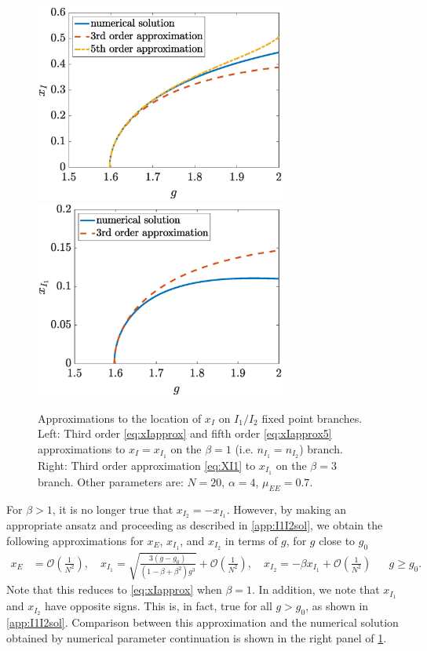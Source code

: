 \documentclass[reqno]{siamonline190516}
\begin{document}
\begin{figure}
    \centering
    \includegraphics[width=8.25cm]{Xiapprox.eps}\hspace{-0.5cm}
    \includegraphics[width=8.25cm]{Xiapproxbeta3.eps} 
    \caption{Approximations to the location of $x_I$ on $I_1/I_2$ fixed point branches. Left: Third order \cref{eq:xIapprox} and fifth order  \cref{eq:xIapprox5} approximations to $x_I=x_{I_1}$ on the $\beta = 1$ (i.e. $n_{I_1}=n_{I_2}$) branch. Right: Third order approximation \cref{eq:XI1} to $x_{I_1}$ on the $\beta=3$ branch. Other parameters are: $N = 20$,  $\alpha = 4$, $\mu_{EE} = 0.7$.}
    \label{fig:xIapprox}
\end{figure}

For $\beta > 1$, it is no longer true that $x_{I_2} = -x_{I_1}$. However, by making an appropriate ansatz and proceeding as described in \cref{app:I1I2sol}, we obtain the following approximations for $x_E$, $x_{I_1}$, and $x_{I_2}$ in terms of $g$, for $g$ close to $g_0$
\begin{align}\label{eq:XI1}
 x_E &= \mathcal{O}\left( \frac{1}{N^2}\right), \quad
 x_{I_1} = \sqrt{ \frac{ 3(g - g_0) }{ (1 - \beta + \beta^2 )g^3}} + \mathcal{O}\left( \frac{1}{N^2}\right), \quad
 x_{I_2} = -\beta x_{I_1} +  \mathcal{O}\left( \frac{1}{N^2}\right) && g \geq g_0.
\end{align}
Note that this reduces to \cref{eq:xIapprox} when $\beta = 1$. In addition, we note that $x_{I_1}$ and $x_{I_2}$ have opposite signs. This is, in fact, true for all $g > g_0$, as shown in \cref{app:I1I2sol}. Comparison between this approximation and the numerical solution obtained by numerical parameter continuation is shown in the right panel of \cref{fig:xIapprox}.
\end{document}
